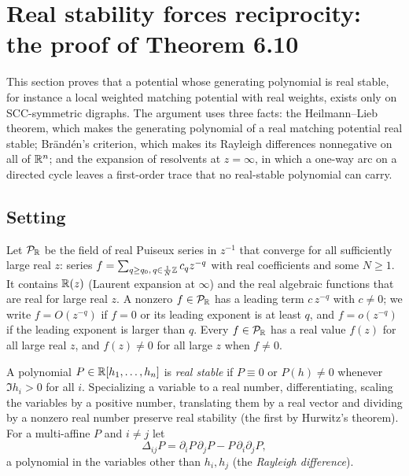 \section{Real stability forces reciprocity: the proof of Theorem 6.10}\label{sec:realstab}

This section proves that a potential whose generating polynomial is real stable, for instance a local weighted matching potential with real weights, exists only on SCC-symmetric digraphs. The argument uses three facts: the Heilmann--Lieb theorem, which makes the generating polynomial of a real matching potential real stable; Br\"and\'en's criterion, which makes its Rayleigh differences nonnegative on all of $\mathbb{R}^n$; and the expansion of resolvents at $z=\infty$, in which a one-way arc on a directed cycle leaves a first-order trace that no real-stable polynomial can carry.

\subsection{Setting}\label{ssec:real-setting}
Let $\mathcal{P}_{\mathbb{R}}$ be the field of real Puiseux series in $z^{-1}$ that converge for all sufficiently large real $z$: series $f=\sum_{q\ge q_0,\,q\in\frac1N\mathbb{Z}}c_qz^{-q}$ with real coefficients and some $N\ge1$. It contains $\mathbb{R}(z)$ (Laurent expansion at $\infty$) and the real algebraic functions that are real for large real $z$. A nonzero $f\in\mathcal{P}_{\mathbb{R}}$ has a leading term $c\,z^{-q}$ with $c\neq0$; we write $f=O(z^{-q})$ if $f=0$ or its leading exponent is at least $q$, and $f=o(z^{-q})$ if the leading exponent is larger than $q$. Every $f\in\mathcal{P}_{\mathbb{R}}$ has a real value $f(z)$ for all large real $z$, and $f(z)\neq0$ for all large $z$ when $f\ne0$.

A polynomial $P\in\mathbb{R}[h_1,\dots,h_n]$ is \emph{real stable} if $P\equiv0$ or $P(h)\neq0$ whenever $\Im h_i>0$ for all $i$. Specializing a variable to a real number, differentiating, scaling the variables by a positive number, translating them by a real vector and dividing by a nonzero real number preserve real stability (the first by Hurwitz's theorem). For a multi-affine $P$ and $i\ne j$ let
\[
\Delta_{ij}P=\partial_iP\,\partial_jP-P\,\partial_i\partial_jP,
\]
a polynomial in the variables other than $h_i,h_j$ (the \emph{Rayleigh difference}).

